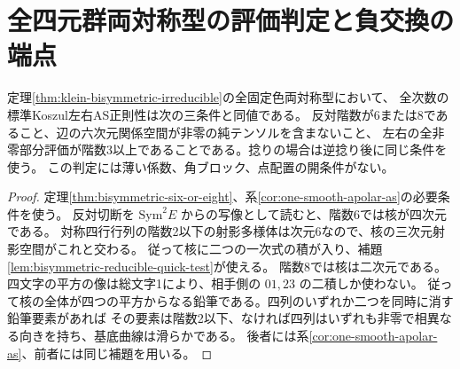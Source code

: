 \section{全四元群両対称型の評価判定と負交換の端点}
\label{sec:negative-exchange-end-values}
\begin{theorem}\label{thm:all-klein-bisymmetric-evaluation}
定理\ref{thm:klein-bisymmetric-irreducible}の全固定色両対称型において、
全次数の標準Koszul左右AS正則性は次の三条件と同値である。
反対階数が6または8であること、辺の六次元関係空間が非零の純テンソルを含まないこと、
左右の全非零部分評価が階数3以上であることである。捻りの場合は逆捻り後に同じ条件を使う。
この判定には薄い係数、角ブロック、点配置の開条件がない。
\end{theorem}
\begin{proof}
定理\ref{thm:bisymmetric-six-or-eight}、系\ref{cor:one-smooth-apolar-as}の必要条件を使う。
反対切断を $\mathrm{Sym}^2 E$ からの写像として読むと、階数6では核が四次元である。
対称四行行列の階数2以下の射影多様体は次元6なので、核の三次元射影空間がこれと交わる。
従って核に二つの一次式の積が入り、補題\ref{lem:bisymmetric-reducible-quick-test}が使える。
階数8では核は二次元である。四文字の平方の像は総文字1により、相手側の $01,23$ の二積しか使わない。
従って核の全体が四つの平方からなる鉛筆である。四列のいずれか二つを同時に消す鉛筆要素があれば
その要素は階数2以下、なければ四列はいずれも非零で相異なる向きを持ち、基底曲線は滑らかである。
後者には系\ref{cor:one-smooth-apolar-as}、前者には同じ補題を用いる。
\end{proof}

